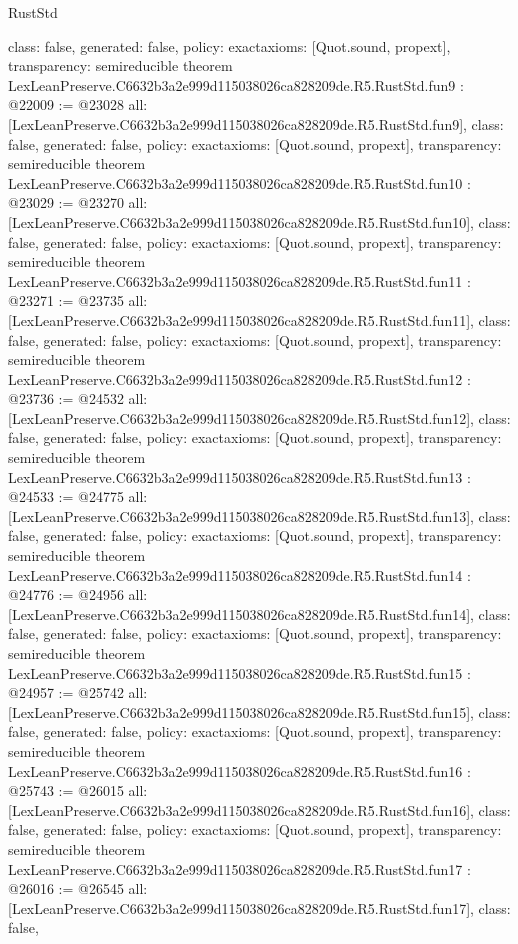 \begin{lexlean}{RustStd}
\begin{coremodule}
{  class: false,
  generated: false,
  policy: exact{axioms: [Quot.sound, propext]},
  transparency: semireducible
}
theorem LexLeanPreserve.C6632b3a2e999d115038026ca828209de.R5.RustStd.fun9 : @22009 := @23028 {
  all: [LexLeanPreserve.C6632b3a2e999d115038026ca828209de.R5.RustStd.fun9],
  class: false,
  generated: false,
  policy: exact{axioms: [Quot.sound, propext]},
  transparency: semireducible
}
theorem LexLeanPreserve.C6632b3a2e999d115038026ca828209de.R5.RustStd.fun10 : @23029 := @23270 {
  all: [LexLeanPreserve.C6632b3a2e999d115038026ca828209de.R5.RustStd.fun10],
  class: false,
  generated: false,
  policy: exact{axioms: [Quot.sound, propext]},
  transparency: semireducible
}
theorem LexLeanPreserve.C6632b3a2e999d115038026ca828209de.R5.RustStd.fun11 : @23271 := @23735 {
  all: [LexLeanPreserve.C6632b3a2e999d115038026ca828209de.R5.RustStd.fun11],
  class: false,
  generated: false,
  policy: exact{axioms: [Quot.sound, propext]},
  transparency: semireducible
}
theorem LexLeanPreserve.C6632b3a2e999d115038026ca828209de.R5.RustStd.fun12 : @23736 := @24532 {
  all: [LexLeanPreserve.C6632b3a2e999d115038026ca828209de.R5.RustStd.fun12],
  class: false,
  generated: false,
  policy: exact{axioms: [Quot.sound, propext]},
  transparency: semireducible
}
theorem LexLeanPreserve.C6632b3a2e999d115038026ca828209de.R5.RustStd.fun13 : @24533 := @24775 {
  all: [LexLeanPreserve.C6632b3a2e999d115038026ca828209de.R5.RustStd.fun13],
  class: false,
  generated: false,
  policy: exact{axioms: [Quot.sound, propext]},
  transparency: semireducible
}
theorem LexLeanPreserve.C6632b3a2e999d115038026ca828209de.R5.RustStd.fun14 : @24776 := @24956 {
  all: [LexLeanPreserve.C6632b3a2e999d115038026ca828209de.R5.RustStd.fun14],
  class: false,
  generated: false,
  policy: exact{axioms: [Quot.sound, propext]},
  transparency: semireducible
}
theorem LexLeanPreserve.C6632b3a2e999d115038026ca828209de.R5.RustStd.fun15 : @24957 := @25742 {
  all: [LexLeanPreserve.C6632b3a2e999d115038026ca828209de.R5.RustStd.fun15],
  class: false,
  generated: false,
  policy: exact{axioms: [Quot.sound, propext]},
  transparency: semireducible
}
theorem LexLeanPreserve.C6632b3a2e999d115038026ca828209de.R5.RustStd.fun16 : @25743 := @26015 {
  all: [LexLeanPreserve.C6632b3a2e999d115038026ca828209de.R5.RustStd.fun16],
  class: false,
  generated: false,
  policy: exact{axioms: [Quot.sound, propext]},
  transparency: semireducible
}
theorem LexLeanPreserve.C6632b3a2e999d115038026ca828209de.R5.RustStd.fun17 : @26016 := @26545 {
  all: [LexLeanPreserve.C6632b3a2e999d115038026ca828209de.R5.RustStd.fun17],
  class: false,
}
\end{coremodule}
\end{lexlean}
